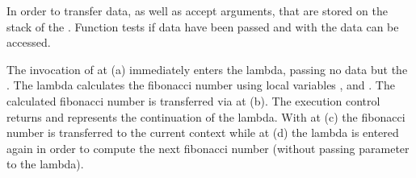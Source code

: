 In order to transfer data, \call as well as \op accept arguments, that are
stored on the stack of the \currcont. Function \davail tests if data have been
passed and with \dget the data can be accessed.

The invocation of \call at (a) immediately enters the lambda, passing no data
but the \currcont. The lambda calculates the fibonacci number using local
variables ,  and . The calculated fibonacci number is
transferred via \op at (b). The execution control returns and 
represents the continuation of the lambda. With \dget at (c) the fibonacci
number is transferred to the current context while at (d) the lambda is entered
again in order to compute the next fibonacci number (without passing parameter
to the lambda).

